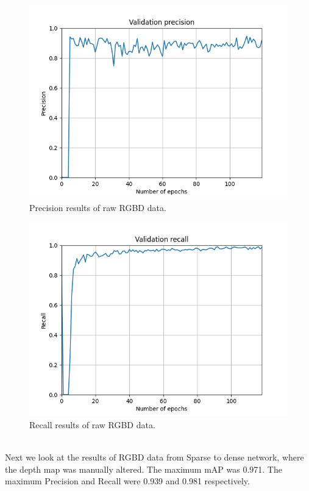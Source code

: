 \documentclass[twoside]{ctuthesis}
\theoremstyle{plain}
\theoremstyle{definition}
\theoremstyle{note}
\begin{document}
\pagebreak
\begin{figure}[h!]
	\centering
	\includegraphics[width=\textwidth]{run-no_depth120e-tag-validation_precision.png}
	\caption{Precision results of raw RGBD data.}
\end{figure}
\begin{figure}[h!]
	\centering
	\includegraphics[width=\textwidth]{run-no_depth120e-tag-validation_recall.png}
	\caption{Recall results of raw RGBD data.}
\end{figure}
\pagebreak
\\
Next we look at the results of RGBD data from Sparse to dense network, where the depth map was manually altered. The maximum mAP was 0.971. The maximum Precision and Recall were 0.939 and 0.981 respectively.
\end{document}
